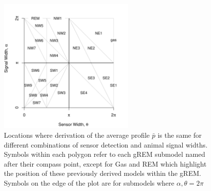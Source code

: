\begin{figure}[b]
\centering
\includegraphics[width=0.6\textwidth]{../imgs/equalRegions.pdf}

\caption{Locations where derivation of the average profile $\bar{p}$ is the same for different combinations of sensor detection and animal signal widths. Symbols within each polygon refer to each gREM submodel named after their compass point, except for Gas and REM which highlight the position of these previously derived models within the gREM. Symbols on the edge of the plot are for submodels where $\alpha, \theta = 2\pi$}
\label{f:equalRegions}
\end{figure}



